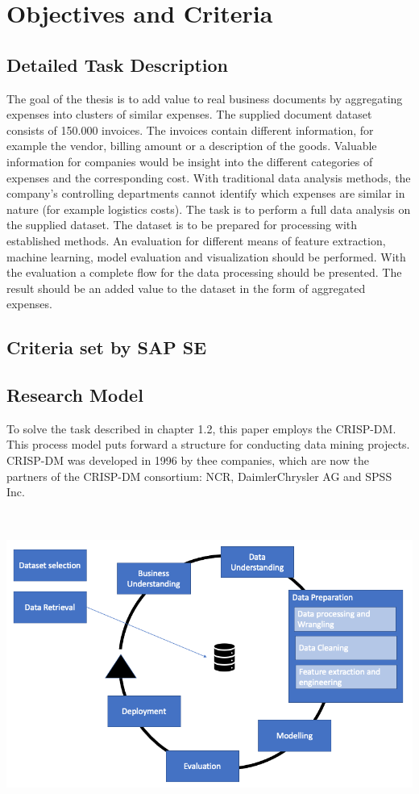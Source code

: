 \chapter{Objectives and Criteria}
\section{Detailed Task Description}
The goal of the thesis is to add value to real business documents by aggregating expenses into clusters of similar expenses. The supplied document dataset consists of 150.000 invoices. The invoices contain different information, for example the vendor, billing amount or a description of the goods. Valuable information for companies would be insight into the different categories of expenses and the corresponding cost. With traditional data analysis methods, the company’s controlling departments cannot identify which expenses are similar in nature (for example logistics costs). 
The task is to perform a full data analysis on the supplied dataset. The dataset is to be prepared for processing with established methods. An evaluation for different means of feature extraction, machine learning, model evaluation and visualization should be performed. With the evaluation a complete flow for the data processing should be presented. The result should be an added value to the dataset in the form of aggregated expenses.

\section{Criteria set by SAP SE}

\section{Research Model}
To solve the task described in chapter 1.2, this paper employs the \ac{CRISP-DM}. This process model \cite{chapman_crisp-dm_2000} puts forward a structure for conducting data mining projects. \ac{CRISP-DM} was developed in 1996 by thee companies, which are now the partners of the \ac{CRISP-DM} consortium: NCR, DaimlerChrysler AG and SPSS Inc.

\includegraphics[height=10cm]{Bilder/Research_Model.png} 